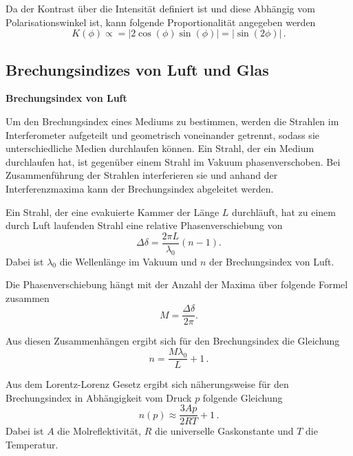 Da der Kontrast über die Intensität definiert ist und diese Abhängig vom Polarisationswinkel ist, kann folgende Proportionalität angegeben werden
\begin{equation*}
    K(\phi) \propto = | 2 \cos{(\phi)} \sin{(\phi)} | = |\sin{(2\phi)}| \, .
\end{equation*}



\subsection{Brechungsindizes von Luft und Glas}
\textbf{Brechungsindex von Luft}

Um den Brechungsindex eines Mediums zu bestimmen, werden die Strahlen im Interferometer aufgeteilt und geometrisch voneinander getrennt, sodass sie unterschiedliche Medien durchlaufen können. Ein Strahl, der ein Medium durchlaufen hat, ist gegenüber einem Strahl im Vakuum phasenverschoben. Bei Zusammenführung der Strahlen interferieren sie und anhand der Interferenzmaxima kann der Brechungsindex abgeleitet werden. %

Ein Strahl, der eine evakuierte Kammer der Länge $L$ durchläuft, hat zu einem durch Luft laufenden Strahl eine relative Phasenverschiebung von %
\begin{equation*}
    \Delta \delta = \frac{2 \pi L}{\lambda_{0}} (n-1) .
\end{equation*}
Dabei ist $\lambda_0$ die Wellenlänge im Vakuum und $n$ der Brechungsindex von Luft.

Die Phasenverschiebung hängt mit der Anzahl der Maxima über folgende Formel zusammen 
\begin{equation*}
    M = \frac{\Delta \delta}{2 \pi} . 
\end{equation*}

Aus diesen Zusammenhängen ergibt sich für den Brechungsindex die Gleichung
\begin{equation}
    n = \frac{M \lambda_0}{L} + 1 \, .
    \label{eq:brechungsindex}
\end{equation}

Aus dem Lorentz-Lorenz Gesetz
ergibt sich näherungsweise für den Brechungsindex in Abhängigkeit vom Druck $p$ folgende Gleichung
\begin{equation*}
    n(p) \approx \frac{3 A p}{2 R T} + 1 \,.
    \label{eq:n_p}
\end{equation*}
Dabei ist $A$ die Molreflektivität, $R$ die universelle Gaskonstante und $T$ die Temperatur.
\\


